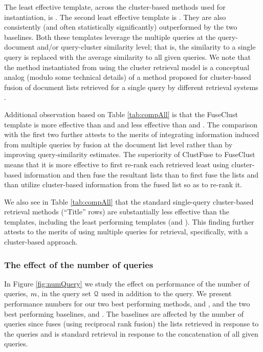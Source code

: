The least effective template, across the cluster-based methods used
for instantiation, is \poolClust. The second least effective template
is \feature. They are also consistently (and often statistically
significantly) outperformed by the two baselines. Both these templates
leverage the multiple queries at the query-document and/or
query-cluster similarity level; that is, the similarity to a single
query is replaced with the average similarity to all given queries. We
note that the method instantiated from \poolClust using the \interp
cluster retrieval model is a conceptual analog (modulo some technical
details) of a method proposed for cluster-based fusion of document lists
retrieved for a single query by different retrieval systems
\cite{Kozorovitzky+Kurland:11b}.

Additional observation based on Table \ref{tab:compAll} is that the FuseClust template is more effective than \poolClust and \feature and less effective than \clustFuse and \queryCat. The comparison with the first two further attests to the merits of integrating information induced from multiple queries by fusion at the document list level rather than by improving query-similarity estimates. The superiority of ClustFuse to FuseClust means that it is more effective to first re-rank each retrieved least using cluster-based information and then fuse the resultant lists than to first fuse the lists and than utilize cluster-based information from the fused list so as to re-rank it.

We also see in Table \ref{tab:compAll} that the standard single-query
cluster-based retrieval methods (``Title'' rows) are substantially less effective than the templates, including the least performing templates (\poolClust and \feature). This finding further attests to the merits of using multiple queries for retrieval, specifically, with a cluster-based approach.



\subsubsection{The effect of the number of queries}
\label{sec:size}





In Figure \ref{fig:numQuery} we study the effect on performance of the
number of queries, $m$, in the query set ${\mathcal Q}$ used in
addition to the \titleQuery query. We present performance numbers for
our two best performing methods, \inst{\interp}{\queryCat} and
\inst{\clustMRF}{\clustFuse}, and the two best performing baselines,
\fuseClust and \queryCat. The baselines are affected by the number of
queries since \fuseClust fuses (using reciprocal rank fusion) the
lists retrieved in response to the queries and \queryCat is standard retrieval in response to the concatenation of all given queries.

